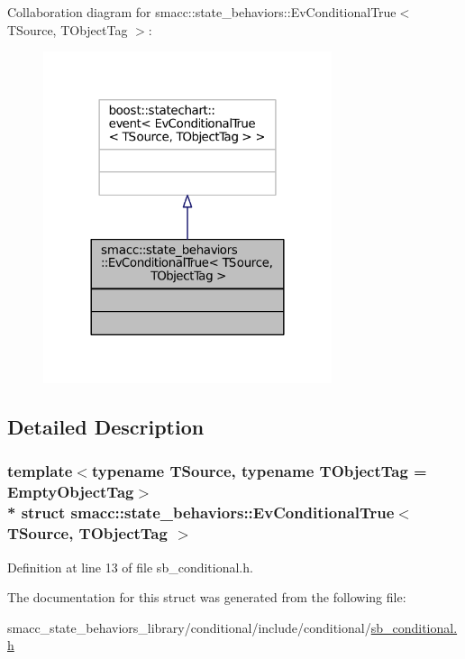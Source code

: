 Collaboration diagram for smacc\+:\+:state\+\_\+behaviors\+:\+:Ev\+Conditional\+True$<$ T\+Source, T\+Object\+Tag $>$\+:
\nopagebreak
\begin{figure}[H]
\begin{center}
\leavevmode
\includegraphics[width=240pt]{structsmacc_1_1state__behaviors_1_1EvConditionalTrue__coll__graph}
\end{center}
\end{figure}


\subsection{Detailed Description}
\subsubsection*{template$<$typename T\+Source, typename T\+Object\+Tag = Empty\+Object\+Tag$>$\\*
struct smacc\+::state\+\_\+behaviors\+::\+Ev\+Conditional\+True$<$ T\+Source, T\+Object\+Tag $>$}



Definition at line 13 of file sb\+\_\+conditional.\+h.



The documentation for this struct was generated from the following file\+:\begin{DoxyCompactItemize}
\item 
smacc\+\_\+state\+\_\+behaviors\+\_\+library/conditional/include/conditional/\hyperlink{sb__conditional_8h}{sb\+\_\+conditional.\+h}\end{DoxyCompactItemize}
